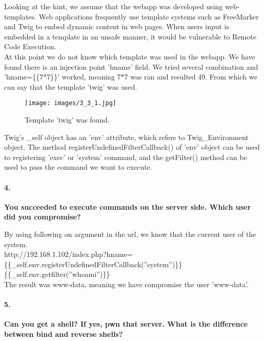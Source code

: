 \documentclass[12pt]{report}
\begin{document}
	Looking at the hint, we assume that the webapp was developed using web-templates. Web applications frequently use template systems such as FreeMarker and Twig to embed dynamic content in web pages. When users input is embedded in a template in an unsafe manner, it would be vulnerable to Remote Code Execution.\\
	
	At this point we do not know which template was used in the webapp. We have found there is an injection point 'hname' field. We tried several combination and 'hname=\{\{7*7\}\}' worked, meaning 7*7 was ran and resulted 49. From which we can say that the template 'twig' was used.
	
	\begin{figure}[H]
		\texttt{[image: images/3\_3\_1.jpg]}
		\caption{Template 'twig' was found.}
	\end{figure}

	Twig's {\sf \_self} object has an {\sf 'env'} attribute, which refers to {\sf Twig\_Environment} object. The method {\sf registerUndefinedFilterCallback()} of {\sf 'env'} object can be used to registering {\sf 'exec'} or {\sf 'system'} command, and the {\sf getFilter()} method can be used to pass the command we want to execute.\\
	
	\paragraph*{4.}{\bf You succeeded to execute commands on the server side. Which user did you compromise?}
	
	By using following on argument in the url, we know that the current user of the system.\\
	{\sf http://192.168.1.102/index.php?hname=\{\{\_self.env.registerUndefinedFilterCallback(''system'')\}\} \{\{\_self.env.getfilter(''whoami'')\}\}}\\
	
	The result was {\sf www-data}, meaning we have compromise the user 'www-data'.
	
	\paragraph*{5.}{\bf Can you get a shell? If yes, pwn that server. What is the difference between bind and reverse shells?}
	
\end{document}
